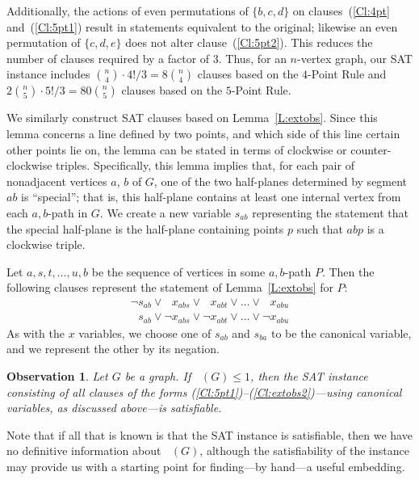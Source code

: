 \documentclass[12pt]{amsart}
\newtheorem{observation}[theorem]{Observation}
\theoremstyle{remark}
\DeclareMathOperator{\obs}{\ensuremath{\mathrm{obs}}}
\DeclareMathOperator{\obsout}{\ensuremath{\obs_\mathrm{out}}}
\begin{document}
Additionally, the actions of even permutations of $\{b,c,d\}$ on clauses~(\ref{Cl:4pt} and~(\ref{Cl:5pt1})
result in statements equivalent to the original; 
likewise an even permutation of $\{c,d,e\}$
does not alter clause~(\ref{Cl:5pt2}).
This reduces the number of clauses required by a factor of $3$.
Thus, for an $n$-vertex graph,
our SAT instance includes
$\binom{n}{4}\cdot 4! / 3 = 8\binom{n}{4}$
clauses based on the $4$-Point Rule
and
$2\binom{n}{5}\cdot 5! / 3 = 80\binom{n}{5}$
clauses based on the $5$-Point Rule.

We similarly construct SAT clauses based on Lemma~\ref{L:extobs}.
Since this lemma concerns a line defined by two
points, and which side of this line certain other points lie on,
the lemma can be stated
in terms of clockwise or counter-clockwise triples.
Specifically,
this lemma implies that,
for each pair of nonadjacent vertices $a$, $b$ of $G$,
one of the two half-planes
determined by segment $ab$
is ``special'';
that is, this half-plane
contains at least one internal vertex from each $a,b$-path in $G$.
We create a new variable $s_{ab}$ representing the statement
that the special half-plane is the half-plane containing points $p$
such that $abp$ is a clockwise triple.

Let $a,s,t,\dots,u,b$ be the sequence of vertices in some $a,b$-path $P$.
Then the following clauses represent
the statement of Lemma~\ref{L:extobs} for $P$:
\begin{gather}
\label{Cl:extobs1}
\neg s_{ab} \vee \phantom{\neg} x_{abs} \vee \phantom{\neg} x_{abt} \vee
  \dots \vee \phantom{\neg} x_{abu}\\
\label{Cl:extobs2}
\phantom{\neg} s_{ab} \vee \neg x_{abs} \vee \neg x_{abt} \vee
  \dots \vee \neg x_{abu}
\end{gather}
As with the $x$ variables,
we choose one of $s_{ab}$ and $s_{ba}$
to be the canonical variable,
and we represent the other by its negation.

\begin{observation} \label{O:sat-obsout}
Let $G$ be a graph.
If $\obsout(G) \le 1$,
then the SAT instance consisting of all clauses
of the forms (\ref{Cl:5pt1})--(\ref{Cl:extobs2})---using
canonical variables, as discussed above---is
satisfiable. \end{observation}

Note that if all that is known is that the SAT instance is satisfiable,
then we have no definitive information about $\obsout(G)$,
although the satisfiability of the instance may
provide
us with a starting point for finding---by hand---a useful embedding.
\end{document}
